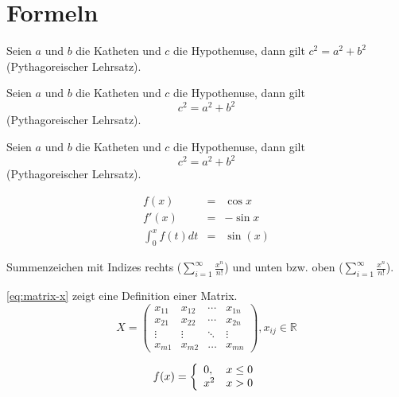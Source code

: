 \section{Formeln}

Seien $a$ und $b$ die Katheten und $c$ die Hypothenuse, dann gilt $c^{2} = a^{2} + b^{2}$ (Pythagoreischer Lehrsatz).

Seien $a$ und $b$ die Katheten und $c$ die Hypothenuse, dann gilt
  \[ c^{2} = a^{2} + b^{2} \]
(Pythagoreischer Lehrsatz).

Seien $a$ und $b$ die Katheten und $c$ die Hypothenuse, dann gilt
  \begin{equation}\label{eq:pyth2}
    c^{2} = a^{2} + b^{2}
  \end{equation}
(Pythagoreischer Lehrsatz).

\begin{eqnarray}
  f(x) & = & \cos x \nonumber\\
  f'(x) & = & -\sin x \nonumber\\
  \int_{0}^{x} f(t) dt & = & \sin(x)
\end{eqnarray}

Summenzeichen mit Indizes rechts ($\sum_{i=1}^{\infty} \frac{x^n}{n!}$) und unten bzw. oben ($\sum\limits_{i=1}^{\infty} \frac{x^n}{n!}$).

\ref{eq:matrix-x} zeigt eine Definition einer Matrix.
\begin{equation} \label{eq:matrix-x}
  X =
  \begin{pmatrix}
    x_{11} & x_{12} & \cdots  & x_{1n} \\
    x_{21} & x_{22}  & \cdots & x_{2n} \\
    \vdots  & \vdots & \ddots & \vdots \\
    x_{m1} & x_{m2} & \hdots  & x_{mn}
  \end{pmatrix}
  , x_{ij} \in \mathbb{R}
\end{equation}

\begin{equation}
f(x) =
  \left\{
    \begin{array}{l@{\quad}l}
      0, &  x\leq 0\\
      x^2 & x>0
    \end{array}
  \right.
\end{equation}
